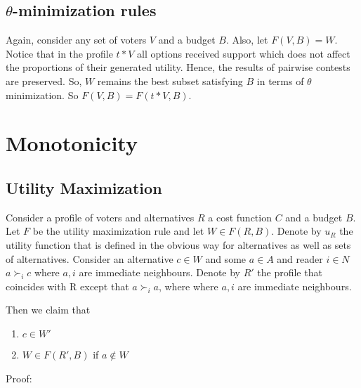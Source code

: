 \documentclass{article}
\begin{document}
\subsection{$\theta$-minimization rules}
Again, consider any set of voters $V$ and a budget $B$. Also, let $F(V, B) = W$. Notice that in the profile $t*V$ all options received support which does not affect the proportions of their generated utility. Hence, the results of pairwise contests are preserved. So, $W$ remains the best subset satisfying $B$ in terms of $\theta$ minimization. So $F(V, B) = F(t*V, B)$.

\section{Monotonicity}

\subsection{Utility Maximization}

Consider a profile of voters and alternatives $R$ a cost function $C$ and a budget $B$. Let $F$ be the utility maximization rule and let $W\in F(R,B)$. Denote by $u_R$ the utility function that is defined in the obvious way for alternatives as well as sets of alternatives. Consider an alternative $c\in W$ and some $a\in A$ and reader $i\in N$  $a\succ_i c$ where $a,i$ are immediate neighbours. Denote by $R'$ the profile that coincides with R except that $a\succ_i a$, where where $a,i$ are immediate neighbours.

Then we claim that
\begin{enumerate}
\item $c\in W'$
\item $W\in F(R',B)$ if $a\notin W$
\end{enumerate}
Proof:
\end{document}
